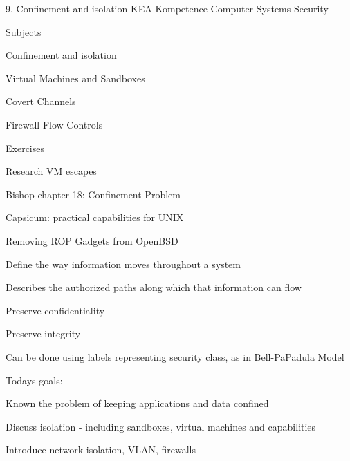 \documentclass[Screen16to9,17pt]{foils}
\begin{document}
\mytitlepage
{9. Confinement and isolation}
{KEA Kompetence Computer Systems Security \the\year}



\begin{list1}
\item Subjects
\begin{list2}
\item Confinement and isolation
\item Virtual Machines and Sandboxes
\item Covert Channels
\item Firewall Flow Controls
\end{list2}
\item Exercises
\begin{list2}
\item Research VM escapes
\end{list2}
\end{list1}




\begin{list1}
\item Bishop chapter 18: Confinement Problem
\item Capsicum: practical capabilities for UNIX
\item Removing ROP Gadgets from OpenBSD
\end{list1}


\begin{list1}
\item Define the way information moves throughout a system
\item Describes the authorized paths along which that information can flow
\begin{list2}
\item Preserve confidentiality
\item Preserve integrity
\end{list2}
\item Can be done using labels representing security class, as in Bell-PaPadula Model
\end{list1}



Todays goals:
\begin{list2}
\item Known the problem of keeping applications and data confined
\item Discuss isolation - including sandboxes, virtual machines and capabilities
\item Introduce network isolation, VLAN, firewalls
\end{list2}
\end{document}

